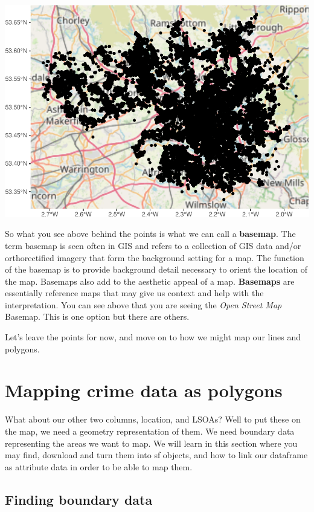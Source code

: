 \documentclass[
]{book}
\begin{document}
\includegraphics{crime_mapping_files/figure-latex/unnamed-chunk-15-1.pdf}

So what you see above behind the points is what we can call a \textbf{basemap}. The term basemap is seen often in GIS and refers to a collection of GIS data and/or orthorectified imagery that form the background setting for a map. The function of the basemap is to provide background detail necessary to orient the location of the map. Basemaps also add to the aesthetic appeal of a map. \textbf{Basemaps} are essentially reference maps that may give us context and help with the interpretation. You can see above that you are seeing the \emph{Open Street Map} Basemap. This is one option but there are others.

Let's leave the points for now, and move on to how we might map our lines and polygons.

\hypertarget{mapping-crime-data-as-polygons}{%
\section{Mapping crime data as polygons}\label{mapping-crime-data-as-polygons}}

What about our other two columns, location, and LSOAs? Well to put these on the map, we need a geometry representation of them. We need boundary data representing the areas we want to map. We will learn in this section where you may find, download and turn them into sf objects, and how to link our dataframe as attribute data in order to be able to map them.

\hypertarget{finding-boundary-data}{%
\subsection{Finding boundary data}\label{finding-boundary-data}}
\end{document}
